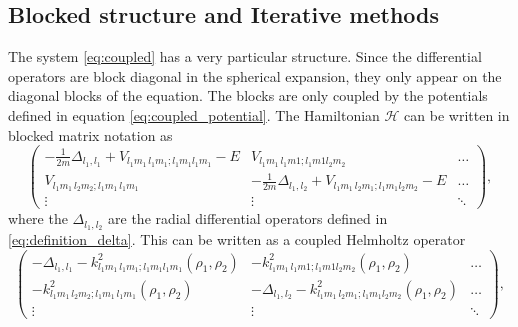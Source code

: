 \documentclass[mathpazo]{cicp}
\theoremstyle{definition}
\numberwithin{equation}{section}
\providecommand{\wv}{}
\begin{document}
\subsection{Blocked structure and Iterative methods}
The system \eqref{eq:coupled} has a very particular structure.  Since
the differential operators are block diagonal in the spherical
expansion, they only appear on the diagonal blocks of the
equation. The blocks are only coupled by the potentials \wv{defined in
  equation \eqref{eq:coupled_potential}}. \wv{The Hamiltonian
  $\mathcal{H}$ can be written in blocked matrix notation as
\begin{equation}\label{eq:blocked}
 \begin{pmatrix}
 -\frac{1}{2m} \Delta_{l_1,l_1}  + V_{l_1m_1\,l_1m_1;l_1m_1 l_1m_1}-E &  V_{l_1m_1\,l_1m1;l_1m1l_2m_2} & \ldots \\
       V_{l_1m_1\,l_2m_2;l_1m_1\,l_1m_1} & -\frac{1}{2m}\Delta_{l_1,l_2} + V_{l_1m_1\,l_2m_1;l_1m_1l_2m_2} -E &\ldots\\
\vdots & \vdots & \ddots
 \end{pmatrix},
\end{equation}}
where the $\Delta_{l_1,l_2}$ are the radial differential operators
defined in \eqref{eq:definition_delta}. This can be written as a
coupled Helmholtz operator  \wv{\begin{equation}
 \begin{pmatrix}
 -\Delta_{l_1,l_1}  -k^2_{l_1m_1\,l_1m_1;l_1m_1 l_1m_1}(\rho_1,\rho_2)&  -k^2_{l_1m_1\,l_1m1;l_1m1l_2m_2}(\rho_1,\rho_2) & \ldots \\
       -k^2_{l_1m_1\,l_2m_2;l_1m_1\,l_1m_1}(\rho_1,\rho_2) & -\Delta_{l_1,l_2} - k^2_{l_1m_1\,l_2m_1;l_1m_1l_2m_2}(\rho_1,\rho_2)&\ldots\\
\vdots & \vdots & \ddots
 \end{pmatrix},
\label{eq:blocked_helmholtz}
\end{equation}}
\end{document}
